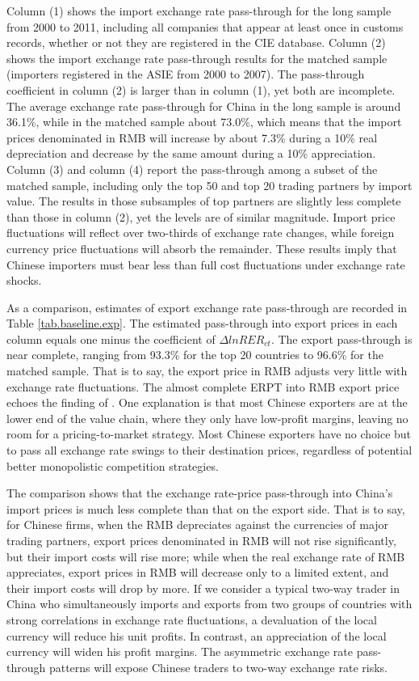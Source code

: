 \documentclass[12pt]{article}
\begin{document}
Column (1) shows the import exchange rate pass-through for the long sample from 2000 to 2011, including all companies that appear at least once in customs records, whether or not they are registered in the CIE database. Column (2) shows the import exchange rate pass-through results for the matched sample (importers registered in the ASIE from 2000 to 2007). The pass-through coefficient in column (2) is larger than in column (1), yet both are incomplete. The average exchange rate pass-through for China in the long sample is around 36.1\%, while in the matched sample about 73.0\%, which means that the import prices denominated in RMB will increase by about 7.3\% during a 10\% real depreciation and decrease by the same amount during a 10\% appreciation. Column (3) and column (4) report the pass-through among a subset of the matched sample, including only the top 50 and top 20 trading partners by import value. The results in those subsamples of top partners are slightly less complete than those in column (2), yet the levels are of similar magnitude. Import price fluctuations will reflect over two-thirds of exchange rate changes, while foreign currency price fluctuations will absorb the remainder. These results imply that Chinese importers must bear less than full cost fluctuations under exchange rate shocks. 

As a comparison, estimates of export exchange rate pass-through are recorded in Table \ref{tab.baseline.exp}. The estimated pass-through into export prices in each column equals one minus the coefficient of $\Delta lnRER_{ct}$. The export pass-through is near complete, ranging from 93.3\% for the top 20 countries to 96.6\% for the matched sample. That is to say, the export price in RMB adjusts very little with exchange rate fluctuations. The almost complete ERPT into RMB export price echoes the finding of \cite{lmx2015}. One explanation is that most Chinese exporters are at the lower end of the value chain, where they only have low-profit margins, leaving no room for a pricing-to-market strategy. Most Chinese exporters have no choice but to pass all exchange rate swings to their destination prices, regardless of potential better monopolistic competition strategies.

The comparison shows that the exchange rate-price pass-through into China's import prices is much less complete than that on the export side. That is to say, for Chinese firms, when the RMB depreciates against the currencies of major trading partners, export prices denominated in RMB will not rise significantly, but their import costs will rise more; while when the real exchange rate of RMB appreciates, export prices in RMB will decrease only to a limited extent, and their import costs will drop by more. If we consider a typical two-way trader in China who simultaneously imports and exports from two groups of countries with strong correlations in exchange rate fluctuations, a devaluation of the local currency will reduce his unit profits. In contrast, an appreciation of the local currency will widen his profit margins. The asymmetric exchange rate pass-through patterns will expose Chinese traders to two-way exchange rate risks.
\end{document}
